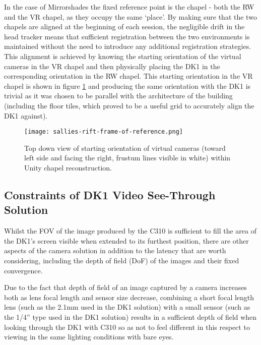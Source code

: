 In the case of Mirrorshades the fixed reference point is the chapel - both the RW and the VR chapel, as they occupy the same `place'. By making sure that the two chapels are aligned at the beginning of each session, the negligible drift in the head tracker means that sufficient registration between the two environments is maintained without the need to introduce any additional registration strategies. This alignment is achieved by knowing the starting orientation of the virtual cameras in the VR chapel and then physically placing the DK1 in the corresponding orientation in the RW chapel. This starting orientation in the VR chapel is shown in figure \ref{sallies-rift-frame-of-reference.png} and producing the same orientation with the DK1 is trivial as it was chosen to be parallel with the architecture of the building (including the floor tiles, which proved to be a useful grid to accurately align the DK1 against).

\begin{figure}
	\begin{center}
		\texttt{[image: sallies-rift-frame-of-reference.png]}
		\caption{Top down view of starting orientation of virtual cameras (toward left side and facing the right, frustum lines visible in white) within Unity chapel reconstruction.}
		\label{sallies-rift-frame-of-reference.png}
	\end{center}
\end{figure}


\subsection{Constraints of DK1 Video See-Through Solution}

\label{constraints_of_dk1_see_through_solution}

Whilst the FOV of the image produced by the C310 is sufficient to fill the area of the DK1's screen visible when extended to its furthest position, there are other aspects of the camera solution in addition to the latency that are worth considering, including the depth of field (DoF) of the images and their fixed convergence.

Due to the fact that depth of field of an image captured by a camera increases both as lens focal length and sensor size decrease, combining a short focal length lens (such as the 2.1mm used in the DK1 solution) with a small sensor (such as the 1/4'' type used in the DK1 solution) results in a sufficient depth of field when looking through the DK1 with C310 so as not to feel different in this respect to viewing in the same lighting conditions with bare eyes.

